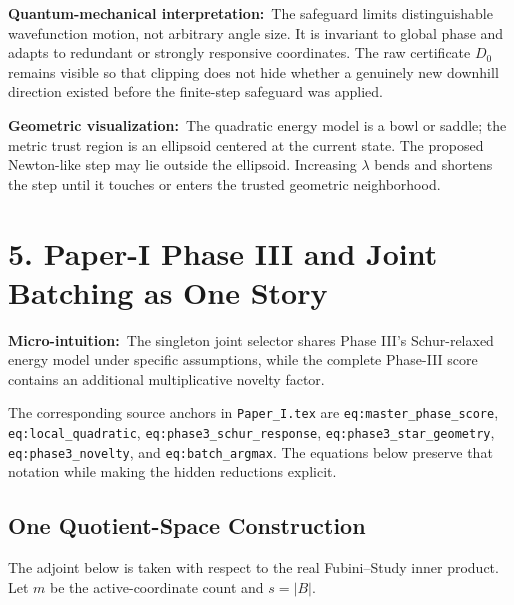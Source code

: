 \documentclass[10pt,twocolumn]{article}
\newcommand{\micro}[1]{\par\noindent\textbf{Micro-intuition:}\ #1\par}
\newcommand{\phys}[1]{\par\noindent\textbf{Quantum-mechanical interpretation:}\ #1\par}
\newcommand{\geom}[1]{\par\noindent\textbf{Geometric visualization:}\ \textcolor{teal!70!black}{#1}\par}
\newcommand{\conceptbreak}{\par\medskip\noindent{\color{black!30}\rule{\columnwidth}{0.35pt}}\par\medskip}
\begin{document}
\phys{The safeguard limits distinguishable wavefunction motion, not arbitrary
angle size. It is invariant to global phase and adapts to redundant or strongly
responsive coordinates. The raw certificate \(D_0\) remains
visible so that clipping does not hide whether a genuinely new downhill
direction existed before the finite-step safeguard was applied.}

\geom{The quadratic energy model is a bowl or saddle; the metric trust region
is an ellipsoid centered at the current state. The proposed Newton-like step
may lie outside the ellipsoid. Increasing \(\lambda\) bends and shortens the
step until it touches or enters the trusted geometric neighborhood.}

\conceptbreak

\section*{5. Paper-I Phase III and Joint Batching as One Story}

\micro{The singleton joint selector shares Phase III's Schur-relaxed energy
model under specific assumptions, while the complete Phase-III score contains
an additional multiplicative novelty factor.}

The corresponding source anchors in \texttt{Paper\_I.tex} are
\nolinkurl{eq:master_phase_score}, \nolinkurl{eq:local_quadratic},
\nolinkurl{eq:phase3_schur_response},
\nolinkurl{eq:phase3_star_geometry}, \nolinkurl{eq:phase3_novelty}, and
\nolinkurl{eq:batch_argmax}. The equations below preserve that notation while
making the hidden reductions explicit.

\subsection*{One Quotient-Space Construction}

The adjoint below is taken with respect to the real Fubini--Study inner
product. Let \(m\) be the active-coordinate count and \(s=|B|\).
\end{document}
